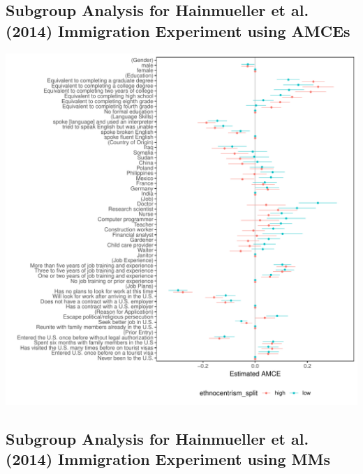 \documentclass[a4paper,12pt]{article}\usepackage[]{graphicx}\usepackage[]{color}
\makeatletter
\def\maxwidth{ %
  \ifdim\Gin@nat@width>\linewidth
    \linewidth
  \else
    \Gin@nat@width
  \fi
}
\newenvironment{knitrout}{}{} %
\makeatother
\begin{document}
\clearpage

\subsection{Subgroup Analysis for Hainmueller et al. (2014) Immigration Experiment using AMCEs}

\begin{knitrout}
\color{fgcolor}
\includegraphics[width=\maxwidth]{figure/hainmueller_immigration_subgroup_amce_appendix-1} 

\end{knitrout}

\clearpage

\subsection{Subgroup Analysis for Hainmueller et al. (2014) Immigration Experiment using MMs}
\end{document}
